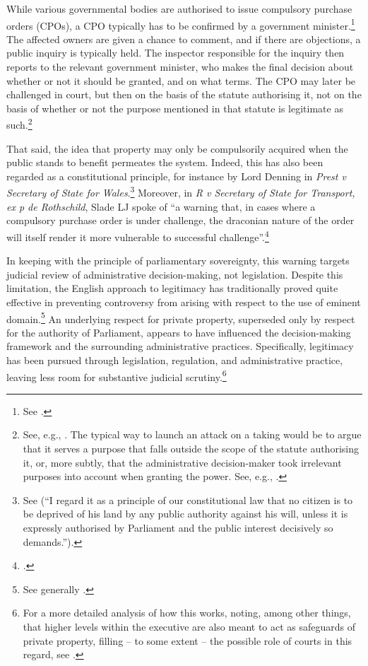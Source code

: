 While various governmental bodies are authorised to issue compulsory purchase orders (CPOs), a CPO typically has to be confirmed by a government minister.\footnote{See \cite[48]{waring09}.} The affected owners are given a chance to comment, and if there are objections, a public inquiry is typically held. The inspector responsible for the inquiry then reports to the relevant government minister, who makes the final decision about whether or not it should be granted, and on what terms. The CPO may later be challenged in court, but then on the basis of the statute authorising it, not on the basis of whether or not the purpose mentioned in that statute is legitimate as such.\footnote{See, e.g., \cite[48-49]{waring09}. The typical way to launch an attack on a taking would be to argue that it serves a purpose that falls outside the scope of the statute authorising it, or, more subtly, that the administrative decision-maker took irrelevant purposes into account when granting the power. See, e.g., \cite{sainsbury10}.}

That said, the idea that property may only be compulsorily acquired when the public stands to benefit permeates the system. Indeed, this has also been regarded as a constitutional principle, for instance by Lord Denning in {\it Prest v Secretary of State for Wales}.\footnote{See \cite[198]{prest82} (``I regard it as a principle of our constitutional law that no citizen is to be deprived of his land by any public authority against his will, unless it is expressly authorised by Parliament and the public interest decisively so demands.'').} Moreover, in {\it R v Secretary of State for Transport, ex p de Rothschild}, Slade LJ spoke of ``a warning that, in cases where a compulsory purchase order is under challenge, the draconian nature of the order will itself render it more vulnerable to successful challenge''.\footcite[938]{rothschild89}

In keeping with the principle of parliamentary sovereignty, this warning targets judicial review of administrative decision-making, not legislation. Despite this limitation, the English approach to legitimacy has traditionally proved quite effective in preventing controversy from arising with respect to the use of eminent domain.\footnote{See generally \cite{allen10}.} An underlying respect for private property, superseded only by respect for the authority of Parliament, appears to have influenced the decision-making framework and the surrounding administrative practices. Specifically, legitimacy has been pursued through legislation, regulation, and administrative practice, leaving less room for substantive judicial scrutiny.\footnote{For a more detailed analysis of how this works, noting, among other things, that higher levels within the executive are also meant to act as safeguards of private property, filling -- to some extent -- the possible role of courts in this regard, see \cite[85-100]{allen08}.}

